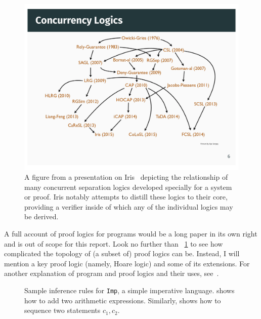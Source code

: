 \begin{figure}[ht]
    \centering
    \includegraphics[width=\textwidth]{img/iris_2_0_concurrent_logics}
    \caption{A figure from a presentation on Iris~\cite{Jung_2016_slides}
    depicting the relationship of many concurrent separation logics developed
    specially for a system or proof. Iris notably attempts to distill these
    logics to their core, providing a verifier inside of which any of the
    individual logics may be derived.}\label{F:iris_complex}
\end{figure}

A full account of proof logics for programs would be a long paper in its own
right and is out of scope for this report. Look no further than
\figurename~\ref{F:iris_complex} to see how complicated the topology of (a
subset of) proof logics can be. Instead, I will mention a key proof logic
(namely, Hoare logic) and some of its extensions. For another explanation of
program and proof logics and their uses, see~\cite[\S 5]{Appel_2011}.

\begin{figure}[ht]
    \centering
    \caption{Sample inference rules for \texttt{Imp}, a simple imperative
    language.  shows how to add two arithmetic expressions.
    Similarly,  shows how to sequence two statements \(c_1,
    c_2\).}\label{F:Imp_ex}
\end{figure}

